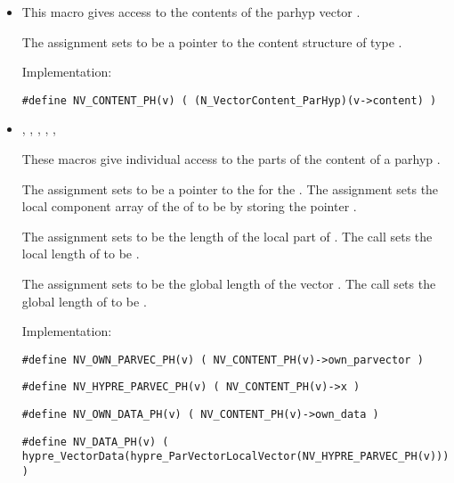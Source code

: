 \begin{itemize}

\item 

  This macro gives access to the contents of the parhyp
  vector .
  
  The assignment  sets       
   to be a pointer to the  content    
  structure of type .
  
  Implementation:
  
  \verb|#define NV_CONTENT_PH(v) ( (N_VectorContent_ParHyp)(v->content) )|
  
\item 
  , , 
  , , 
  , 
  
  These macros give individual access to the parts of    
  the content of a parhyp .                        

  The assignment  sets  to be     
  a pointer to the   for the  . 
  The assignment  sets the local component array of 
  the   of  to be  by storing the pointer 
  .              
  
  The assignment  sets  to be     
  the length of the local part of . 
  The call  sets      
  the local length of  to be .
  
  The assignment  sets  to  
  be the global length of the vector .                    
  The call  sets the global       
  length of  to be .
  
  Implementation:
  
  \verb|#define NV_OWN_PARVEC_PH(v) ( NV_CONTENT_PH(v)->own_parvector )|

  \verb|#define NV_HYPRE_PARVEC_PH(v) ( NV_CONTENT_PH(v)->x )|

  \verb|#define NV_OWN_DATA_PH(v) ( NV_CONTENT_PH(v)->own_data )|

  \verb|#define NV_DATA_PH(v) ( hypre_VectorData(hypre_ParVectorLocalVector(NV_HYPRE_PARVEC_PH(v))) )|


\end{itemize}
